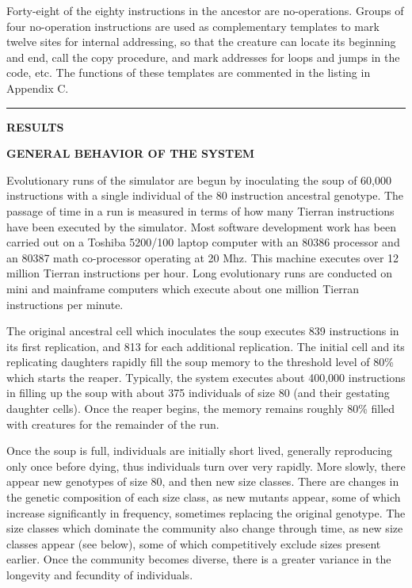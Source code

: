 Forty-eight of the eighty instructions in the ancestor are no-operations.
Groups of four no-operation instructions are used as complementary templates
to mark twelve sites for internal addressing, so that the creature can locate
its beginning and end, call the copy procedure, and mark addresses for loops
and jumps in the code, etc.  The functions of these templates are commented
in the listing in Appendix C.

\LP
\rule[6pt]{6.5in}{1pt}

\large \bf RESULTS\rm \normalsize

\bf GENERAL BEHAVIOR OF THE SYSTEM\rm
\eLP

Evolutionary runs of the simulator are begun by inoculating the soup of
60,000 instructions with a single individual of the 80 instruction ancestral
genotype.  The passage of time in a run is measured in terms of how many
Tierran instructions have been executed by the simulator.  Most software
development work has been carried out on a Toshiba 5200/100 laptop computer
with an 80386 processor and an 80387 math co-processor operating at 20 Mhz.
This machine executes over 12 million Tierran instructions per hour.
Long evolutionary runs are conducted on mini and mainframe computers which
execute about one million Tierran instructions per minute.

The original ancestral cell which inoculates the soup executes 839
instructions in its first replication, and 813 for each additional
replication.  The initial cell and its replicating daughters
rapidly fill the soup memory to the threshold level of 80\% which starts the
reaper.  Typically, the system executes about 400,000 instructions in filling
up the soup with about 375 individuals of size 80 (and their gestating
daughter cells).  Once the reaper begins, the memory remains roughly 80\%
filled with creatures for the remainder of the run.

Once the soup is full, individuals are initially short lived,
generally reproducing only once before dying, thus individuals turn over
very rapidly.  More slowly, there appear new genotypes of size 80, and then
new size classes.  There are changes in the genetic composition
of each size class, as new mutants appear, some of which increase significantly
in frequency, sometimes replacing the original genotype.  The size classes
which dominate the community also change through time, as new size classes
appear (see below), some of which competitively exclude sizes present earlier.
Once the community becomes diverse, there is a greater variance in
the longevity and fecundity of individuals.

